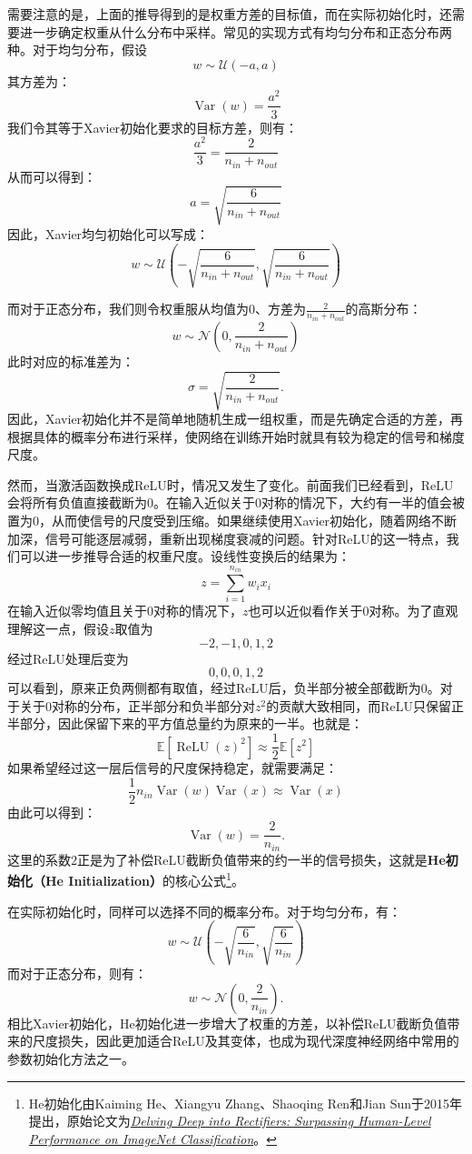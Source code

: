 需要注意的是，上面的推导得到的是权重方差的目标值，而在实际初始化时，还需要进一步确定权重从什么分布中采样。常见的实现方式有均匀分布和正态分布两种。对于均匀分布，假设
$$
w\sim\mathcal{U}(-a,a)
$$
其方差为：
$$
\operatorname{Var}(w)=\frac{a^2}{3}
$$
我们令其等于Xavier初始化要求的目标方差，则有：
$$
\frac{a^2}{3}=\frac{2}{n_{in}+n_{out}}
$$
从而可以得到：
$$
a=\sqrt{\frac{6}{n_{in}+n_{out}}}
$$
因此，Xavier均匀初始化可以写成：
$$
w\sim\mathcal{U}\left(-\sqrt{\frac{6}{n_{in}+n_{out}}},\sqrt{\frac{6}{n_{in}+n_{out}}}\right)
$$

而对于正态分布，我们则令权重服从均值为$0$、方差为$\frac{2}{n_{in}+n_{out}}$的高斯分布：
$$
w\sim\mathcal{N}\left(0,\frac{2}{n_{in}+n_{out}}\right)
$$
此时对应的标准差为：
$$
\sigma=\sqrt{\frac{2}{n_{in}+n_{out}}}.
$$
因此，Xavier初始化并不是简单地随机生成一组权重，而是先确定合适的方差，再根据具体的概率分布进行采样，使网络在训练开始时就具有较为稳定的信号和梯度尺度。

然而，当激活函数换成ReLU时，情况又发生了变化。前面我们已经看到，ReLU会将所有负值直接截断为$0$。在输入近似关于$0$对称的情况下，大约有一半的值会被置为$0$，从而使信号的尺度受到压缩。如果继续使用Xavier初始化，随着网络不断加深，信号可能逐层减弱，重新出现梯度衰减的问题。针对ReLU的这一特点，我们可以进一步推导合适的权重尺度。设线性变换后的结果为：
$$
z=\sum_{i=1}^{n_{in}}w_ix_i
$$
在输入近似零均值且关于$0$对称的情况下，$z$也可以近似看作关于$0$对称。为了直观理解这一点，假设$z$取值为
$$
-2,-1,0,1,2
$$
经过ReLU处理后变为
$$
0,0,0,1,2
$$
可以看到，原来正负两侧都有取值，经过ReLU后，负半部分被全部截断为$0$。对于关于$0$对称的分布，正半部分和负半部分对$z^2$的贡献大致相同，而ReLU只保留正半部分，因此保留下来的平方值总量约为原来的一半。也就是：
$$
\mathbb{E}[\operatorname{ReLU}(z)^2]\approx\frac{1}{2}\mathbb{E}[z^2]
$$
如果希望经过这一层后信号的尺度保持稳定，就需要满足：
$$
\frac{1}{2}n_{in}\operatorname{Var}(w)\operatorname{Var}(x)\approx\operatorname{Var}(x)
$$
由此可以得到：
$$
\operatorname{Var}(w)=\frac{2}{n_{in}}.
$$
这里的系数$2$正是为了补偿ReLU截断负值带来的约一半的信号损失，这就是\textbf{He初始化（He Initialization）}的核心公式\footnote{He初始化由Kaiming He、Xiangyu Zhang、Shaoqing Ren和Jian Sun于2015年提出，原始论文为\href{https://www.cv-foundation.org/openaccess/content_iccv_2015/papers/He_Delving_Deep_into_ICCV_2015_paper.pdf}{\textit{Delving Deep into Rectifiers: Surpassing Human-Level Performance on ImageNet Classification}}。}。

在实际初始化时，同样可以选择不同的概率分布。对于均匀分布，有：
$$
w\sim\mathcal{U}\left(-\sqrt{\frac{6}{n_{in}}},\sqrt{\frac{6}{n_{in}}}\right)
$$
而对于正态分布，则有：
$$
w\sim\mathcal{N}\left(0,\frac{2}{n_{in}}\right).
$$
相比Xavier初始化，He初始化进一步增大了权重的方差，以补偿ReLU截断负值带来的尺度损失，因此更加适合ReLU及其变体，也成为现代深度神经网络中常用的参数初始化方法之一。

